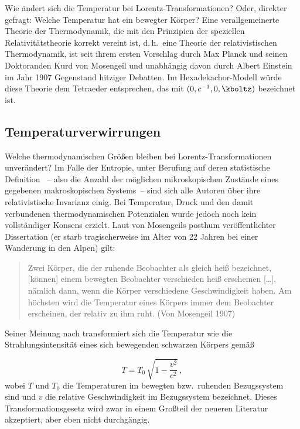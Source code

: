 \documentclass{scrartcl}
\begin{document}
\newpage {}
\label{sec:0101}

Wie ändert sich die Temperatur bei Lorentz-Transformationen? Oder, direkter gefragt: Welche Temperatur hat ein bewegter Körper? Eine verallgemeinerte Theorie der Thermodynamik, die mit den Prinzipien der speziellen Relativitätstheorie korrekt vereint ist, d.\,h.\ eine Theorie der relativistischen Thermodynamik, ist seit ihrem ersten Vorschlag durch Max Planck und seinen Doktoranden Kurd von Mosengeil und unabhängig davon durch Albert Einstein im Jahr 1907 Gegenstand hitziger Debatten. Im Hexadekachor-Modell würde diese Theorie dem Tetraeder entsprechen, das mit $(0,c^{-1},0,\kboltz)$ bezeichnet ist.


\subsection*{Temperaturverwirrungen}

Welche thermodynamischen Größen bleiben bei Lorentz-Transformationen unverändert? Im Falle der Entropie, unter Berufung auf deren statistische Definition ~-- also die Anzahl der möglichen mikroskopischen Zustände eines gegebenen makroskopischen Systems~-- sind sich alle Autoren über ihre relativistische Invarianz einig. Bei Temperatur, Druck und den damit verbundenen thermodynamischen Potenzialen wurde jedoch noch kein vollständiger Konsens erzielt. Laut von Mosengeils posthum veröffentlichter Dissertation (er starb tragischerweise im Alter von 22 Jahren bei einer Wanderung in den Alpen) gilt:

\begin{quote}
  Zwei Körper, die der ruhende Beobachter als gleich heiß bezeichnet, [können] einem bewegten Beobachter verschieden heiß erscheinen [\dots], nämlich dann, wenn die Körper verschiedene Geschwindigkeit haben. Am höchsten wird die Temperatur eines Körpers immer dem Beobachter erscheinen, der relativ zu ihm ruht. (Von Mosengeil 1907)
\end{quote}
%
Seiner Meinung nach transformiert sich die Temperatur wie die Strahlungsintensität eines sich bewegenden schwarzen Körpers gemäß

\begin{equation*}\label{reltemplower}
  T = T_0\,\sqrt{1-\frac{v^2}{c^2}}\,,
\end{equation*}
%
wobei $T$ und $T_0$ die Temperaturen im bewegten bzw.\ ruhenden Bezugssystem sind und $v$ die relative Geschwindigkeit im Bezugssystem bezeichnet. Dieses Transformationsgesetz wird zwar in einem Großteil der neueren Literatur akzeptiert, aber eben nicht durchgängig.
\end{document}
